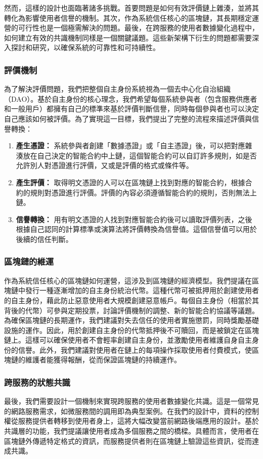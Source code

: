 然而，這樣的設計也面臨著諸多挑戰。首要問題是如何有效評價鏈上雜湊，並將其轉化為影響使用者信譽的機制。其次，作為系統信任核心的區塊鏈，其長期穩定運營的可行性也是一個極需解決的問題。最後，在跨服務的使用者數據變化過程中，如何建立有效的共識機制同樣是一個關鍵議題。這些新架構下衍生的問題都需要深入探討和研究，以確保系統的可靠性和可持續性。
\subsubsection{評價機制}
為了解決評價問題，我們把整個自主身份系統視為一個去中心化自治組織（DAO）。基於自主身份的核心理念，我們希望每個系統參與者（包含服務供應者和一般用戶）都擁有自己的標準來基於評價判斷信譽，同時每個參與者也可以決定自己應該如何被評價。為了實現這一目標，我們提出了完整的流程來描述評價與信譽轉換：
\begin{enumerate}
  \item \textbf{產生憑證：} 系統參與者創建「數據憑證」或「自主憑證」後，可以把對應雜湊放在自己決定的智能合約中上鏈，這個智能合約可以自訂許多規則，如是否允許別人對憑證進行評價，又或是評價的格式或條件等。
  \item \textbf{產生評價：} 取得明文憑證的人可以在區塊鏈上找到對應的智能合約，根據合約的規則對憑證進行評價。評價的內容必須遵循智能合約的規則，否則無法上鏈。
  \item \textbf{信譽轉換：} 用有明文憑證的人找到對應智能合約後可以讀取評價列表，之後根據自己認同的計算標準或演算法將評價轉換為信譽值。這個信譽值可以用於後續的信任判斷。
\end{enumerate}
\subsubsection{區塊鏈的維運}
作為系統信任核心的區塊鏈如何運營，這涉及到區塊鏈的經濟模型。我們提議在區塊鏈中發行一種逐漸增加的自主身份統治代幣。這種代幣可被抵押用於創建使用者的自主身份，藉此防止惡意使用者大規模創建惡意帳戶。每個自主身份（相當於其背後的代幣）可參與定期投票，討論評價機制的調整、新的智能合約協議等議題。為確保區塊鏈的長期運作，我們建議對失去信任的使用者實施懲罰，同時獎勵基礎設施的運作。因此，用於創建自主身份的代幣抵押後不可贖回，而是被鎖定在區塊鏈上。這樣可以確保使用者不會輕率創建自主身份，並激勵使用者維護自身自主身份的信譽。此外，我們建議對使用者在鏈上的每項操作採取使用者付費模式，使區塊鏈的維護者能獲得報酬，從而保證區塊鏈的持續運作。
\subsubsection{跨服務的狀態共識}
最後，我們需要設計一個機制來實現跨服務的使用者數據變化共識。這是一個常見的網路服務需求，如微服務間的調用即為典型案例。在我們的設計中，資料的控制權從服務提供者轉移到使用者身上，這將大幅改變當前網路後端應用的設計。基於共識層的功能，我們提議讓使用者成為多個服務之間的橋樑。具體而言，使用者在區塊鏈外傳遞特定格式的資訊，而服務提供者則在區塊鏈上驗證這些資訊，從而達成共識。

